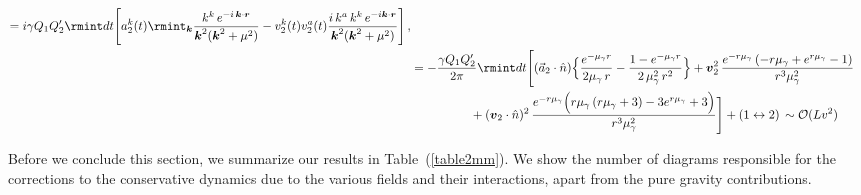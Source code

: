 \begin{itemize}
\begin{align}
\begin{split}
=i\gamma Q_1 Q_2'\rmint dt \Bigg[a^{k}_{2}(t)\rmint_{\boldsymbol{k}}\frac{k^k\,e^{-i\,\boldsymbol{k}\cdot\boldsymbol{r}}}{\boldsymbol{k}^2(\boldsymbol{k}^2+\mu^2)}-v_2^{k}(t)v_{2}^{a}(t)\frac{i\,k^a\,k^k\,e^{-i\boldsymbol{k}\cdot\boldsymbol{r}}}{\boldsymbol{k}^2(\boldsymbol{k}^2+\mu^2)}\Bigg]\,,\\ &
=-\frac{\gamma Q_1 Q_2'}{2\pi}\rmint dt \Bigg[(\Vec{a}_2\cdot \Hat{n})\Big\{\frac{  e^{-\mu_{\gamma} r}}{2 \mu_{\gamma} \,r}-\frac{1 -  e^{-\mu_{\gamma} r}}{2\, \mu_{\gamma}^2\, r^2}\Big\}+\boldsymbol{v}_2^2 \,\frac{e^{-r \mu _{\gamma }} \left(-r \mu _{\gamma }+e^{r \mu _{\gamma }}-1\right)}{  r^3 \mu _{\gamma }^2}\\ &
\,\,\,\,\,\,\,\,\,\,\,\,\,\,\,\,\,\,\,\,\,\,\,\,\,\,\,\,\,
+(\boldsymbol{v}_2\cdot \Hat{n})^2\,\frac{e^{-r \mu _{\gamma }} \Big(r \mu _{\gamma } \left(r \mu _{\gamma }+3\right)-3 e^{r \mu _{\gamma }}+3\Big)}{  r^3 \mu _{\gamma }^2}
\Bigg]+(1\leftrightarrow 2)\,\sim \mathcal{O}(L v^2)\, \label{4.52}
\end{split}
\end{align}
\end{itemize}

Before we conclude this section, we summarize our results in Table~(\ref{table2mm}). We show the number of diagrams responsible for the corrections to the conservative dynamics due to the various fields and their interactions, apart from the pure gravity contributions. %


